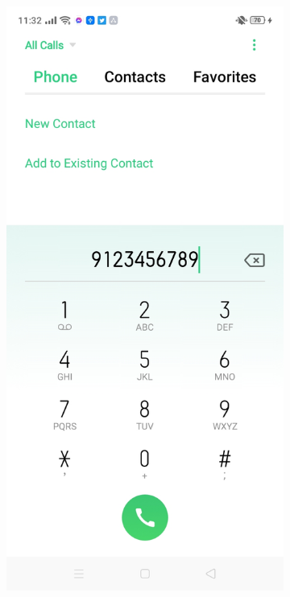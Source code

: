 \begin{figure}[!h]
\begin{subfigure}[c]{0.30\linewidth}
    \end{subfigure}
    \centering
    \begin{subfigure}[c]{0.30\linewidth}
        \centering
        \includegraphics[scale=0.15]{figures/Chapter4/Main/CallPNP.jpg}

\end{subfigure}
\end{figure}
